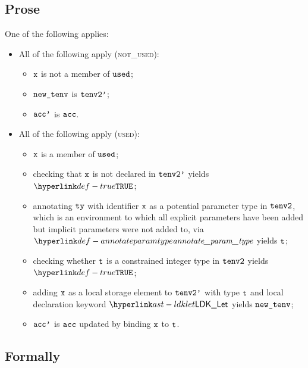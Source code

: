 \subsection{Prose}
One of the following applies:
\begin{itemize}
  \item All of the following apply (\textsc{not\_used}):
  \begin{itemize}
    \item $\texttt{x}$ is not a member of $\texttt{used}$;
    \item $\texttt{new\_tenv}$ is $\texttt{tenv2'}$;
    \item $\texttt{acc'}$ is $\texttt{acc}$.
  \end{itemize}

  \item All of the following apply (\textsc{used}):
  \begin{itemize}
    \item $\texttt{x}$ is a member of $\texttt{used}$;
    \item checking that $\texttt{x}$ is not declared in $\texttt{tenv2'}$ yields $\True$\ProseOrTypeError;
    \item annotating $\texttt{ty}$ with identifier $\texttt{x}$ as a potential parameter type in $\texttt{tenv2}$,
          which is an environment to which all explicit parameters have been added but implicit parameters were not added to,
          via $\annotateparamtype$ yields $\texttt{t}$\ProseOrTypeError;
    \item checking whether $\texttt{t}$ is a constrained integer type in $\texttt{tenv2}$ yields $\True$\ProseOrTypeError;
    \item adding $\texttt{x}$ as a local storage element to $\texttt{tenv2'}$ with type $\texttt{t}$ and local declaration keyword $\LDKLet$ yields
          $\texttt{new\_tenv}$;
    \item $\texttt{acc'}$ is $\texttt{acc}$ updated by binding $\texttt{x}$ to $\texttt{t}$.
  \end{itemize}
\end{itemize}

\subsection{Formally}

